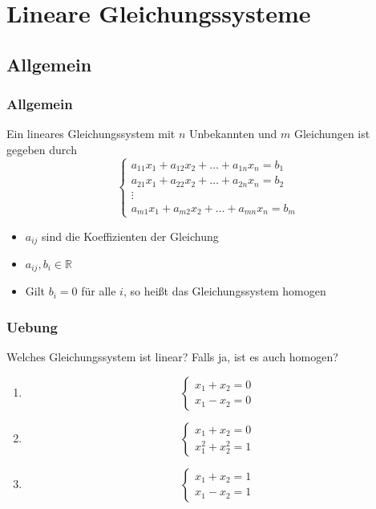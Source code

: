 \section{Lineare Gleichungssysteme}

\subsection{Allgemein}
\begin{frame}
    \frametitle{Allgemein}
    Ein lineares Gleichungssystem mit $n$ Unbekannten und $m$ Gleichungen ist gegeben durch
    \begin{equation*}
        \begin{cases}
            a_{11}x_1 + a_{12}x_2 + \dots + a_{1n}x_n = b_1 \\
            a_{21}x_1 + a_{22}x_2 + \dots + a_{2n}x_n = b_2 \\
            \vdots \\
            a_{m1}x_1 + a_{m2}x_2 + \dots + a_{mn}x_n = b_m
        \end{cases}
    \end{equation*}
    \begin{itemize}
        \item $a_{ij}$ sind die Koeffizienten der Gleichung
        \item $a_{ij},  b_i \in \mathbb{R}$
        \item Gilt $b_i = 0$ für alle $i$, so heißt das Gleichungssystem homogen
    \end{itemize}
\end{frame}

\begin{frame}
    \frametitle{Uebung}
    Welches Gleichungssystem ist linear?
    Falls ja, ist es auch homogen?
    \begin{enumerate}
        \item
        \begin{equation*}
            \begin{cases}
                x_1 + x_2 = 0 \\
                x_1 - x_2 = 0
            \end{cases}
        \end{equation*}
        \item
        \begin{equation*}
            \begin{cases}
                x_1 + x_2 = 0 \\
                x_1^2 + x_2^2 = 1
            \end{cases}
        \end{equation*}
        \item
        \begin{equation*}
            \begin{cases}
                x_1 + x_2 = 1 \\
                x_1 - x_2 = 1
            \end{cases}
        \end{equation*}
    \end{enumerate}
\end{frame}

